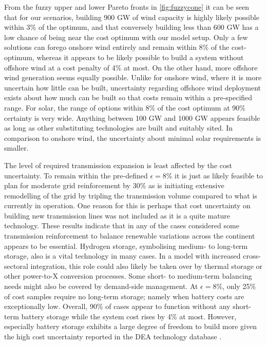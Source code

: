 From the fuzzy upper and lower Pareto fronts in \cref{fig:fuzzycone} it can be
seen that for our scenarios, building 900 GW of wind capacity is highly likely
possible within 3\% of the optimum, and that conversely building less than 600
GW has a low chance of being near the cost optimum with our model setup. Only a
few solutions can forego onshore wind entirely and remain within 8\% of the
cost-optimum, whereas it appears to be likely possible to build a system without
offshore wind at a cost penalty of 4\% at most. On the other hand, more offshore
wind generation seems equally possible. Unlike for onshore wind, where it is more
uncertain how little can be built, uncertainty regarding offshore wind
deployment exists about how much can be built so that costs remain within a
pre-specified range. For solar, the range of options within 8\% of the cost
optimum at 90\% certainty is very wide. Anything between 100 GW and 1000 GW
appears feasible as long as other substituting technologies are built and
suitably sited. In comparison to onshore wind, the uncertainty about minimal
solar requirements is smaller.

The level of required transmission expansion is least affected by the cost
uncertainty. To remain within the pre-defined $\epsilon=8\%$ it is just as
likely feasible to plan for moderate grid reinforcement by 30\% as is initiating
extensive remodelling of the grid by tripling the transmission volume compared
to what is currently in operation. One reason for this is perhaps that cost
uncertainty on building new transmission lines was not included as it is a quite
mature technology. These results indicate that in any of the cases considered
some transmission reinforcement to balance renewable variations across the
continent appears to be essential. Hydrogen storage, symbolising medium- to
long-term storage, also is a vital technology in many cases. In a model with
increased cross-sectoral integration, this role could also likely be taken over
by thermal storage or other power-to-X conversion processes. Some short- to
medium-term balancing needs might also be covered by demand-side management. At
$\epsilon=8\%$, only 25\% of cost samples require no long-term storage; namely
when battery costs are exceptionally low. Overall, 90\% of cases appear to
function without any short-term battery storage while the system cost rises by
4\% at most. However, especially battery storage exhibits a large degree of
freedom to build more given the high cost uncertainty reported in the DEA
technology database \cite{DEA}.

